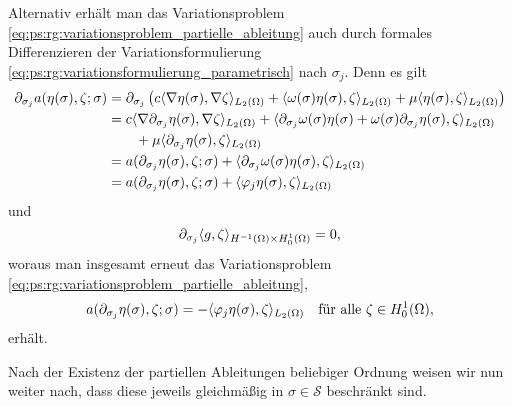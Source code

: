 \begin{Bemerkung}
\label{bem:ps:rg:partielle_ableitungen_alternativ_ueber_ableitung_des_operators}
    Alternativ erhält man das Variationsproblem \cref{eq:ps:rg:variationsproblem_partielle_ableitung} auch durch formales Differenzieren der Variationsformulierung \cref{eq:ps:rg:variationsformulierung_parametrisch} nach $\sigma_{j}$.
    Denn es gilt
    \begin{align}
        \partial_{\sigma_{j}} a(\eta(\sigma), \zeta; \sigma)
        &= \partial_{\sigma_{j}} \left( c \skp{\grad \eta(\sigma)}{\grad \zeta}{L_{2}(\Omega)} + \skp{\omega(\sigma)\eta(\sigma)}{\zeta}{L_{2}(\Omega)} + \mu \skp{\eta(\sigma)}{\zeta}{L_{2}(\Omega)} \right)
        \\&= c \skp{\grad \partial_{\sigma_{j}} \eta(\sigma)}{\grad \zeta}{L_{2}(\Omega)}
                + \skp{\partial_{\sigma_{j}} \omega(\sigma) \eta(\sigma) + \omega(\sigma) \partial_{\sigma_{j}} \eta(\sigma)}{\zeta}{L_{2}(\Omega)}
            \\&\qquad + \mu \skp{\partial_{\sigma_{j}} \eta(\sigma)}{\zeta}{L_{2}(\Omega)}
        \\&= a(\partial_{\sigma_{j}} \eta(\sigma), \zeta; \sigma) + \skp{\partial_{\sigma_{j}} \omega(\sigma) \eta(\sigma)}{\zeta}{L_{2}(\Omega)}
        \\&= a(\partial_{\sigma_{j}} \eta(\sigma), \zeta; \sigma) + \skp{\varphi_{j} \eta(\sigma)}{\zeta}{L_{2}(\Omega)}
    \end{align}
    und
    \begin{equation}
        \partial_{\sigma_{j}} \skp{g}{\zeta}{H^{-1}(\Omega) \times H^{1}_{0}(\Omega)} = 0,
    \end{equation}
    woraus man insgesamt erneut das Variationsproblem \cref{eq:ps:rg:variationsproblem_partielle_ableitung},
    \begin{equation}
        a(\partial_{\sigma_{j}} \eta(\sigma), \zeta; \sigma) = - \skp{\varphi_{j} \eta(\sigma)}{\zeta}{L_{2}(\Omega)} \quad \fa \zeta \in H^{1}_{0}(\Omega),
    \end{equation}
    erhält.
\end{Bemerkung}

Nach der Existenz der partiellen Ableitungen beliebiger Ordnung weisen wir nun weiter nach, dass diese jeweils gleichmäßig in $\sigma \in \mathcal S$ beschränkt sind.


